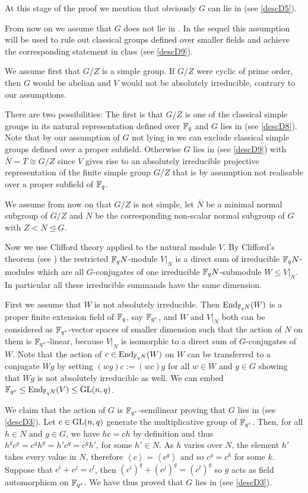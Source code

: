 At this stage of the proof we mention that obviously $G$ can lie
in  (see \ref{descD5}).

From now on we assume that $G$ does not lie in . In the sequel this 
assumption will be used to rule out classical groups defined over
smaller fields and achieve the corresponding statement in class 
(see \ref{descD9}).

We assume first that $G/Z$ is a simple group. If $G/Z$ were cyclic of prime 
order, then $G$ would be abelian and $V$ would not be absolutely
irreducible, contrary to our assumptions.

There are two possibilities:
The first is that $G/Z$ is one of the
classical simple groups in its natural representation defined over $\mathbb{F}_q$
and $G$ lies in  (see
\ref{descD8}). Note that by our assumption of $G$ not lying in  we can
exclude classical simple groups defined over a proper subfield. Otherwise
$G$ lies in  (see \ref{descD9}) with
$\bar N =T \cong G/Z$ since $V$ gives rise to an absolutely irreducible
projective representation of the finite simple group $G/Z$ that
is by assumption not realisable over a proper subfield of $\mathbb{F}_q$.

We assume from now on that $G/Z$ is not simple, let $\bar N$
be a minimal normal subgroup of $G/Z$ and $N$ be
the corresponding non-scalar normal subgroup of $G$ with $Z < N
\unlhd G$.

Now we use Clifford theory applied to the natural module $V$. By Clifford's
theorem (see \cite[(49.2) and (49.7)]{CR0}) the restricted $\mathbb{F}_q N$-module
$V|_N$ is a direct sum of irreducible $\mathbb{F}_q N$-modules which are all
$G$-conjugates of one irreducible $\mathbb{F}_q N$-submodule $W \le V|_N$. In
particular all these irreducible summands have the same dimension. 

First we assume that $W$ is not absolutely irreducible.
Then $\End_{\F_q N}(W)$ is a proper finite
extension field of $\mathbb{F}_q$, say $\mathbb{F}_{q^s}$, and $W$ and $V|_N$
both can be considered as $\mathbb{F}_{q^s}$-vector spaces of smaller dimension
such that the action of
$N$ on them is $\mathbb{F}_{q^s}$-linear, because $V|_N$ is isomorphic to a direct
sum of $G$-conjugates of $W$. Note that the action of $c \in \End_{\F_q
N}(W)$ on $W$ can be transferred to a conjugate $Wg$ by setting
$(wg)c := (wc)g$ for all $w \in W$ and $g \in G$ showing that $Wg$ is
not absolutely irreducible as well.  
We can embed $\F_{q^s} \le \End_{\F_q N}(V) \le \GL(n,q)$.

We claim that the action of $G$ is $\mathbb{F}_{q^s}$-semilinear proving that $G$ lies
in  (see \ref{descD3}). Let $c \in \GL(n,q)$ generate the
multiplicative group of $\mathbb{F}_{q^s}$. Then, for all $h \in N$ and $g
\in G$, we have $hc=ch$ by definition and thus $h^g c^g = c^g h^g =
h' c^g = c^g h'$, for some $h' \in N$. As $h$ varies over $N$, the
element $h'$ takes every value in $N$, therefore $\left< c \right>
= \left< c^g \right>$ and so $c^g = c^k$ for some $k$. Suppose that
$c^i + c^j = c^l$, then $(c^i)^g + (c^j)^g = (c^l)^g$ so $g$ acts as
field automorphism on $\mathbb{F}_{q^s}$. We have thus proved that $G$ 
lies in  (see \ref{descD3}).

